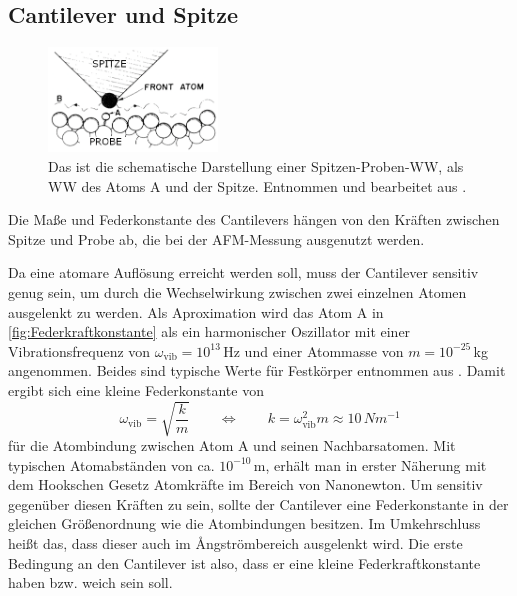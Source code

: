 \subsection{Cantilever und Spitze}
\label{sec:cantilever}
    \setlength{\columnsep}{25pt}
    \begin{figure}
        \centering{}
        \includegraphics[width=0.4\textwidth]{bilder/Federkraftkonstante.png}
        \caption{Das ist die schematische Darstellung einer Spitzen-Proben-WW, als WW des Atoms A und der Spitze. Entnommen und bearbeitet aus \cite{atomic_force_microscope}.} \vspace*{-0.3cm}
        \label{fig:Federkraftkonstante}
    \end{figure} 
    \FloatBarrier
    Die Maße und Federkonstante des Cantilevers hängen von den Kräften zwischen Spitze und Probe ab, die bei der AFM-Messung ausgenutzt werden.
    
    Da eine atomare Auflösung erreicht werden soll, muss der Cantilever sensitiv genug sein, um durch die Wechselwirkung zwischen zwei einzelnen Atomen ausgelenkt zu werden.
    Als Aproximation wird das Atom A in \autoref{fig:Federkraftkonstante} als ein harmonischer Oszillator mit einer Vibrationsfrequenz von $\omega_{\mathrm{vib}} = 10^{13}\,$Hz und einer Atommasse von $m = 10^{-25}\,$kg angenommen.
    Beides sind typische Werte für Festkörper entnommen aus \cite{wiesendanger}.
    Damit ergibt sich eine kleine Federkonstante von
    \begin{equation}
        \omega_{\mathrm{vib}} = \sqrt{\frac{k}{m}} \qquad \Leftrightarrow \qquad k = \omega_{\mathrm{vib}}^2 m \approx 10\,\si{Nm^{-1}}
    \end{equation}
    für die Atombindung zwischen Atom A und seinen Nachbarsatomen.
    Mit typischen Atomabständen von ca. $10^{-10}\,$m, erhält man in erster Näherung mit dem Hookschen Gesetz Atomkräfte im Bereich von Nanonewton.
    Um sensitiv gegenüber diesen Kräften zu sein, sollte der Cantilever eine Federkonstante in der gleichen Größenordnung wie die Atombindungen besitzen.
    Im Umkehrschluss heißt das, dass dieser auch im \r{A}ngströmbereich ausgelenkt wird.
    Die erste Bedingung an den Cantilever ist also, dass er eine kleine Federkraftkonstante haben bzw. weich sein soll.

